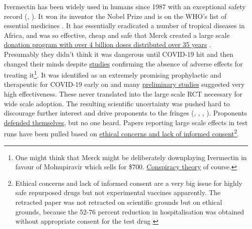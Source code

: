 \documentclass[11pt,a4paper,notitlepage]{report}
\begin{document}
Ivermectin has been widely used in humans since 1987 with an exceptional safety record (\cite{Smit2016-fq}, \cite{Crump2011-ev}). It won its inventor the Nobel Prize and is on the WHO’s list of essential medicines \cite{Crump2017-qg}. It has essentially eradicated a number of tropical diseases in Africa, and was so effective, cheap and safe that Merck created a large scale \href{https://www.merck.com/stories/mectizan/}{donation program with over 4 billion doses distributed over 35 years} \cite{merck06012021}. Presumably they didn't think it was dangerous until COVID-19 hit and then changed their minds despite \href{https://academic.oup.com/ofid/article/8/Supplement_1/S365/6450290}{studies} \cite{wentzel2021} confirming the absence of adverse effects for treating it\footnote{One might think that Merck might be deliberately downplaying Ivermectin in favour of Molnupiravir which sells  for \$700. \href{https://www.bloomberg.com/news/articles/2021-12-08/merck-s-mrk-covid-pill-must-first-overcome-anti-vax-ivermectin-misinformation}{Conspiracy theory} of course.}. It was identified as an extremely promising prophylactic and therapeutic for COVID-19 early on and many \href{https://c19ivermectin.com/}{preliminary studies} suggested very high effectiveness. These never translated into the large scale RCT necessary for wide scale adoption. The resulting scientific uncertainty was pushed hard to discourage further interest and drive proponents to the fringes (\cite{bbc06102021}, \cite{guardian13092021}, \cite{guardian24092021}, \cite{guardian24092021b}). Proponents \href{https://bird-group.org/the-bbcs-recent-article-false-science-is-disintegrating-under-scrutiny/}{defended themselves}, but no one heard. Papers reporting large scale effects in test runs have been pulled based on \href{https://healthpolicy-watch.news/mexico-city-officials-in-row-over-misleading-paper-to-justify-its-ivermectin-drive/}{ethical concerns and lack of informed consent}\footnote{Ethical concerns and lack of informed consent are a very big issue for highly safe repurposed drugs but not experimental vaccines apparently. The retracted paper was not retracted on scientific grounds but on ethical grounds, because the 52-76 percent reduction in hospitalisation was obtained without appropriate consent for the test drug \cite{bmj22022022}}. 
\end{document}
